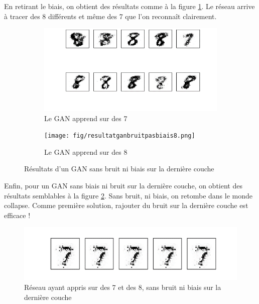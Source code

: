 En retirant le biais, on obtient des résultats comme à la figure \ref{fig:resultat_gan_bruit_sans_biais}. Le réseau arrive à tracer des 8 différents et même des 7 que l'on reconnaît clairement.

\begin{figure}[h!]
  \centering
  \begin{subfigure}[b]{.7\linewidth}
    \includegraphics[width=\linewidth]{fig/resultatganbruitpasbiais.png}
    \caption{Le GAN apprend sur des 7}
  \end{subfigure}
  \quad
  \begin{subfigure}[b]{.2\linewidth}
    \texttt{[image: fig/resultatganbruitpasbiais8.png]}
    \caption{Le GAN apprend sur des 8}
  \end{subfigure}
  \caption{Résultats d'un GAN sans bruit ni biais sur la dernière couche}
  \label{fig:resultat_gan_bruit_sans_biais}
\end{figure}

Enfin, pour un GAN sans biais ni bruit sur la dernière couche, on obtient des résultats semblables à la figure \ref{fig:resultat_gan_ni_bruit_ni_biais}. Sans bruit, ni biais, on retombe dans le monde collapse. Comme première solution, rajouter du bruit sur la dernière couche est efficace !

\begin{figure}[h]
  \centerline{\includegraphics[width=0.6\linewidth]{fig/resultatgannibruitnibiais.png}}
  \caption{Réseau ayant appris sur des 7 et des 8, sans bruit ni biais sur la dernière couche}
  \label{fig:resultat_gan_ni_bruit_ni_biais}
\end{figure}

